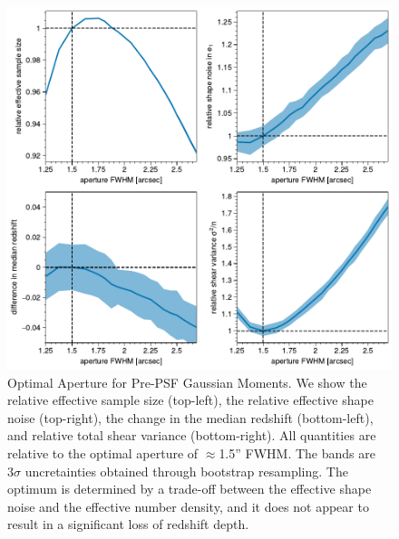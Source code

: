 \documentclass[twocolappendix, appendixfloats, numberedappendix, twocolumn, apj]{openjournal}
\begin{document}
\begin{figure}
  \centering
  \includegraphics[width=\columnwidth]{figures/optap.pdf}

  \caption{
    Optimal Aperture for Pre-PSF Gaussian Moments. We show the relative effective sample
    size (top-left), the relative effective shape noise (top-right), the change in the median
    redshift (bottom-left), and relative total shear variance (bottom-right). All quantities are
    relative to the optimal aperture of $\approx$1.5'' FWHM. The bands are $3\sigma$ uncretainties
    obtained through bootstrap resampling. The optimum is determined by a trade-off
    between the effective shape noise and the effective number density, and it does not appear to
    result in a significant loss of redshift depth.
    \label{fig:opap}
  }

\end{figure}
\end{document}

